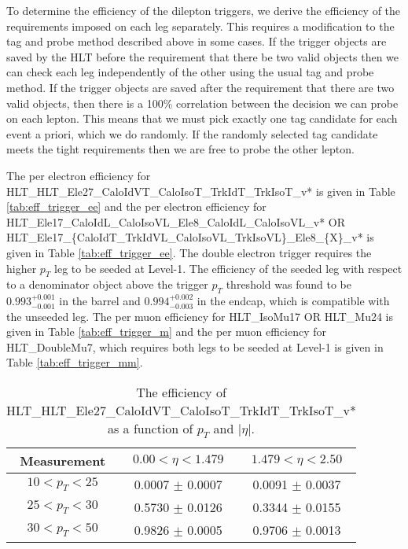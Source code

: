  
To determine the efficiency of the dilepton triggers, 
we derive the efficiency of the requirements imposed on each leg separately.
This requires a modification to the tag and probe method described above in some cases.
If the trigger objects are saved by the HLT before the requirement that there be two valid objects then
we can check each leg independently of the other using the usual tag and probe method.
If the trigger objects are saved after the requirement that there are two valid objects, then there is 
a 100\% correlation between the decision we can probe on each lepton.
This means that we must pick exactly one tag candidate for each event a priori, which we do 
randomly. 
If the randomly selected tag candidate meets the tight requirements then we are free to 
probe the other lepton.

The per electron efficiency for
HLT\_HLT\_Ele27\_CaloIdVT\_CaloIsoT\_TrkIdT\_TrkIsoT\_v*
is given in Table \ref{tab:eff_trigger_ee}
and the per electron efficiency for 
HLT\_Ele17\_CaloIdL\_CaloIsoVL\_Ele8\_CaloIdL\_CaloIsoVL\_v* OR
HLT\_Ele17\_\{CaloIdT\_TrkIdVL\_CaloIsoVL\_TrkIsoVL\}\_Ele8\_\{X\}\_v*
is given in Table \ref{tab:eff_trigger_ee}.
The double electron trigger requires the higher $p_T$ leg to be seeded at Level-1.
The efficiency of the seeded leg with respect to a denominator object above the
trigger $p_T$ threshold was found to be $0.993^{+0.001}_{-0.001}$ in the barrel and
$0.994^{+0.002}_{-0.003}$ in the endcap, which is compatible with the unseeded leg.
The per muon efficiency for
HLT\_IsoMu17 OR HLT\_Mu24
is given in Table \ref{tab:eff_trigger_m}
and the per muon efficiency for HLT\_DoubleMu7, which requires both legs to be seeded
at Level-1 is
given in Table \ref{tab:eff_trigger_mm}.
\vspace{10pt}
\begin{table}[!ht]
\begin{center}
\begin{tabular}{c|c|c}
\hline
Measurement  & $0.00<\eta<1.479$  & $1.479<\eta<2.50$  \\ 
\hline
$  10<p_T<  25$ & 0.0007 $\pm$ 0.0007  & 0.0091 $\pm$ 0.0037  \\ \hline 
$  25<p_T<  30$ & 0.5730 $\pm$ 0.0126  & 0.3344 $\pm$ 0.0155  \\ \hline 
$  30<p_T<  50$ & 0.9826 $\pm$ 0.0005  & 0.9706 $\pm$ 0.0013  \\ \hline 
\end{tabular}
\caption{The efficiency of HLT\_HLT\_Ele27\_CaloIdVT\_CaloIsoT\_TrkIdT\_TrkIsoT\_v* as a function of $p_T$ and $|\eta|$.}
\label{tab:eff_trigger_e}
\end{center}
\end{table}
